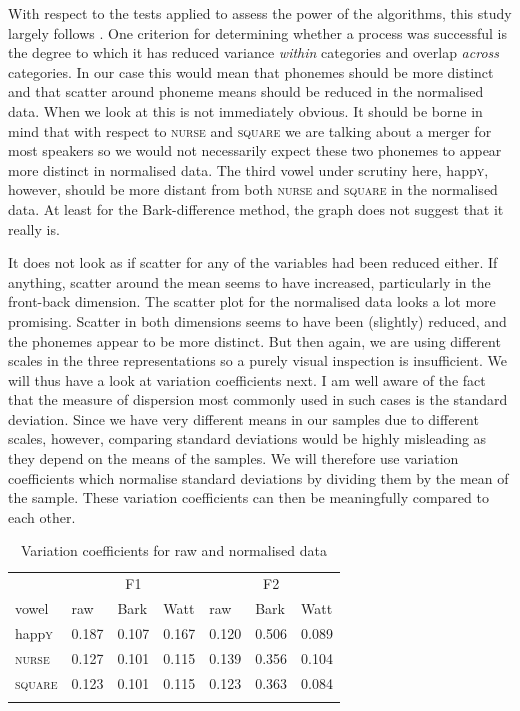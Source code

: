 With respect to the tests applied to assess the power of the  algorithms, this study largely follows \citealt{langstrofdiss}.
One criterion for determining whether a  process was successful is the degree to which it has reduced variance \emph{within} categories and overlap \emph{across} categories.
In our case this would mean that phonemes should be more distinct and that scatter around phoneme means should be reduced in the normalised data.
When we look at  this is not immediately obvious.
It should be borne in mind that with respect to \textsc{nurse} and \textsc{square} we are talking about a merger for most speakers so we would not necessarily expect these two phonemes to appear more distinct in normalised data.
The third vowel under scrutiny here, happ\textsc{y}, however, should be more distant from both \textsc{nurse} and \textsc{square} in the normalised data.
At least for the Bark-difference method, the graph does not suggest that it really is.

It does not look as if scatter for any of the variables had been reduced either.
If anything, scatter around the mean seems to have increased, particularly in the front-back dimension.
The scatter plot for the \citeauthor{wattfabricius2002} normalised data looks a lot more promising.
Scatter in both dimensions seems to have been (slightly) reduced, and the phonemes appear to be more distinct.
But then again, we are using different scales in the three representations so a purely visual inspection is insufficient.
We will thus have a look at variation coefficients next.
I am well aware of the fact that the measure of dispersion most commonly used in such cases is the standard deviation. Since we have very different means in our samples due to different scales, however, comparing standard deviations would be highly misleading as they depend on the means of the samples. We will therefore use variation coefficients which normalise standard deviations by dividing them by the mean of the sample. These variation coefficients can then be meaningfully compared to each other.

\begin{table}
	
	\caption{Variation coefficients for raw and normalised data}
	\begin{tabular}{lllllll}
		\lsptoprule
		& \multicolumn{3}{c}{F1} & \multicolumn{3}{c}{F2}\\
		vowel & raw & Bark & Watt & raw & Bark & Watt\\
		\midrule
		happ\textsc{y} &
		0.187 & 0.107 & 0.167 &
		0.120 & 0.506 & 0.089\\
		\textsc{nurse} &
		0.127 & 0.101 & 0.115 &
		0.139 & 0.356 & 0.104\\
		\textsc{square} &
		0.123 & 0.101 & 0.115 &
		0.123 & 0.363 & 0.084\\
		\lspbottomrule
	\end{tabular}
	\label{tab.varcoeff}
\end{table}

